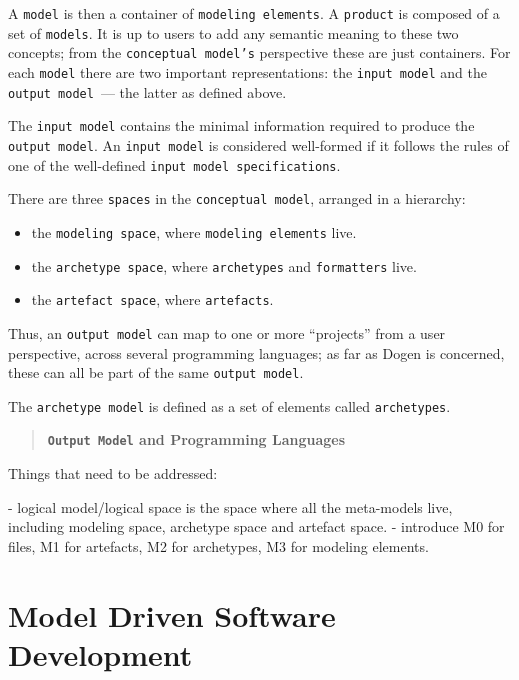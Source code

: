 \documentclass{book}
\begin{document}
A \texttt{model} is then a container of \texttt{modeling elements}.  A
\texttt{product} is composed of a set of \texttt{models}. It is up to
users to add any semantic meaning to these two concepts; from the
\texttt{conceptual model's} perspective these are just containers. For
each \texttt{model} there are two important representations: the
\texttt{input model} and the \texttt{output model}~--- the latter as
defined above.

The \texttt{input model} contains the minimal information required to
produce the \texttt{output model}. An \texttt{input model} is
considered well-formed if it follows the rules of one of the
well-defined \texttt{input model specifications}.

There are three \texttt{spaces} in the \texttt{conceptual model},
arranged in a hierarchy:

\begin{itemize}
  \item the \texttt{modeling space}, where \texttt{modeling elements}
    live.
  \item the \texttt{archetype space}, where \texttt{archetypes} and
    \texttt{formatters} live.
  \item the \texttt{artefact space}, where \texttt{artefacts}.
\end{itemize}

 Thus, an
\texttt{output model} can map to one or more ``projects'' from a user
perspective, across several programming languages; as far as Dogen is
concerned, these can all be part of the same \texttt{output model}.




  The \texttt{archetype model} is defined as a set of elements called
  \texttt{archetypes}.






\begin{quote}
  \textbf{\texttt{Output Model} and Programming Languages}
\end{quote}


Things that need to be addressed:

- logical model/logical space is the space where all the meta-models
live, including modeling space, archetype space and artefact space.
- introduce M0 for files, M1 for artefacts, M2 for archetypes, M3 for
modeling elements.



\chapter{Model Driven Software Development}
\label{mdsd}
\end{document}
